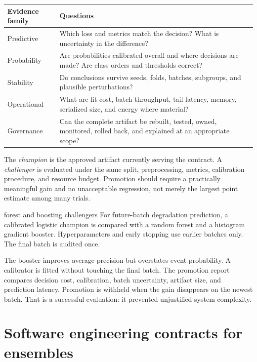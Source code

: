 \begin{center}
\begin{tabularx}{0.95\textwidth}{@{}lX@{}}
\toprule
Evidence family & Questions \\
\midrule
Predictive & Which loss and metrics match the decision? What is uncertainty in
the difference? \\
Probability & Are probabilities calibrated overall and where decisions are
made? Are class orders and thresholds correct? \\
Stability & Do conclusions survive seeds, folds, batches, subgroups, and
plausible perturbations? \\
Operational & What are fit cost, batch throughput, tail latency, memory,
serialized size, and energy where material? \\
Governance & Can the complete artifact be rebuilt, tested, owned, monitored,
rolled back, and explained at an appropriate scope? \\
\bottomrule
\end{tabularx}
\end{center}

The \emph{champion} is the approved artifact currently serving the contract. A
\emph{challenger} is evaluated under the same split, preprocessing, metrics,
calibration procedure, and resource budget. Promotion should require a
practically meaningful gain and no unacceptable regression, not merely the
largest point estimate among many trials.

\begin{workedexample}{forest and boosting challengers}
For future-batch degradation prediction, a calibrated logistic champion is
compared with a random forest and a histogram gradient booster. Hyperparameters
and early stopping use earlier batches only. The final batch is audited once.

The booster improves average precision but overstates event probability. A
calibrator is fitted without touching the final batch. The promotion report
compares decision cost, calibration, batch uncertainty, artifact size, and
prediction latency. Promotion is withheld when the gain disappears on the
newest batch. That is a successful evaluation: it prevented unjustified system
complexity.
\end{workedexample}

\section{Software engineering contracts for ensembles}


